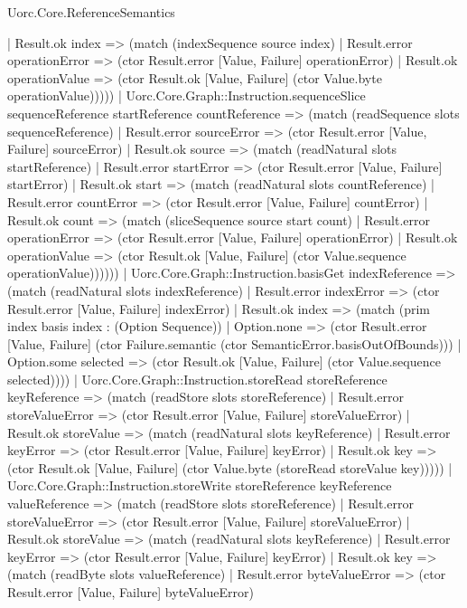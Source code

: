 \begin{lexlean}{Uorc.Core.ReferenceSemantics}
\begin{semanticmodule}
{        | Result.ok index => (match (indexSequence source index)
          | Result.error operationError => (ctor Result.error [Value, Failure] operationError)
          | Result.ok operationValue => (ctor Result.ok [Value, Failure] (ctor Value.byte operationValue)))))
    | Uorc.Core.Graph::Instruction.sequenceSlice sequenceReference startReference countReference => (match (readSequence slots sequenceReference)
      | Result.error sourceError => (ctor Result.error [Value, Failure] sourceError)
      | Result.ok source => (match (readNatural slots startReference)
        | Result.error startError => (ctor Result.error [Value, Failure] startError)
        | Result.ok start => (match (readNatural slots countReference)
          | Result.error countError => (ctor Result.error [Value, Failure] countError)
          | Result.ok count => (match (sliceSequence source start count)
            | Result.error operationError => (ctor Result.error [Value, Failure] operationError)
            | Result.ok operationValue => (ctor Result.ok [Value, Failure] (ctor Value.sequence operationValue))))))
    | Uorc.Core.Graph::Instruction.basisGet indexReference => (match (readNatural slots indexReference)
      | Result.error indexError => (ctor Result.error [Value, Failure] indexError)
      | Result.ok index => (match (prim index basis index : (Option Sequence))
        | Option.none => (ctor Result.error [Value, Failure] (ctor Failure.semantic (ctor SemanticError.basisOutOfBounds)))
        | Option.some selected => (ctor Result.ok [Value, Failure] (ctor Value.sequence selected))))
    | Uorc.Core.Graph::Instruction.storeRead storeReference keyReference => (match (readStore slots storeReference)
      | Result.error storeValueError => (ctor Result.error [Value, Failure] storeValueError)
      | Result.ok storeValue => (match (readNatural slots keyReference)
        | Result.error keyError => (ctor Result.error [Value, Failure] keyError)
        | Result.ok key => (ctor Result.ok [Value, Failure] (ctor Value.byte (storeRead storeValue key)))))
    | Uorc.Core.Graph::Instruction.storeWrite storeReference keyReference valueReference => (match (readStore slots storeReference)
      | Result.error storeValueError => (ctor Result.error [Value, Failure] storeValueError)
      | Result.ok storeValue => (match (readNatural slots keyReference)
        | Result.error keyError => (ctor Result.error [Value, Failure] keyError)
        | Result.ok key => (match (readByte slots valueReference)
          | Result.error byteValueError => (ctor Result.error [Value, Failure] byteValueError)
}
\end{semanticmodule}
\end{lexlean}
